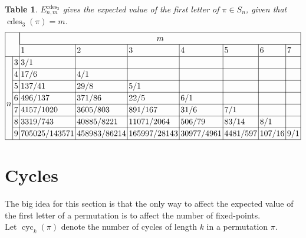 \documentclass{article}
\newcommand{\n}[1]{\multicolumn{1}{|c|}{#1}}
\newtheorem{datatable}[theo]{Table}
\begin{document}
\begin{datatable}
  $E_{n,m}^{\text{cdes}_3}$ gives the expected value of the first letter of $\pi \in S_n$,
  given that $\operatorname{cdes}_3(\pi) = m$.
\[
  \everymath={\displaystyle}
  \arraycolsep=1.4pt\def\arraystretch{1.2}
  \begin{array}{|ll|l|l|l|l|l|l|l|}
    \hline
    & & \multicolumn{7}{|c|}{m} \\ \cline{3-9}
    & & 1 & 2 & 3 & 4 & 5 & 6 & 7\\ \hline
    \multirow{8}{*}{$n$}
    & \n{3} & 3/1           &              &              &            &          &        & \\ \cline{2-9}
    & \n{4} & 17/6          & 4/1          &              &            &          &        & \\ \cline{2-9}
    & \n{5} & 137/41        & 29/8         & 5/1          &            &          &        & \\ \cline{2-9}
    & \n{6} & 496/137       & 371/86       & 22/5         & 6/1        &          &        & \\ \cline{2-9}
    & \n{7} & 4157/1020     & 3605/803     & 891/167      & 31/6       & 7/1      &        & \\ \cline{2-9}
    & \n{8} & 3319/743      & 40885/8221   & 11071/2064   & 506/79     & 83/14    & 8/1    & \\ \cline{2-9}
    & \n{9} & 705025/143571 & 458983/86214 & 165997/28143 & 30977/4961 & 4481/597 & 107/16 & 9/1 \\ \hline
  \end{array}
\]
\end{datatable}
\section{Cycles}
The big idea for this section is that the only way to affect the expected value
of the first letter of a permutation is to affect the number of fixed-points.
\\
Let $\operatorname{cyc}_k(\pi)$ denote the number of cycles of length $k$ in a
permutation $\pi$.
\end{document}
